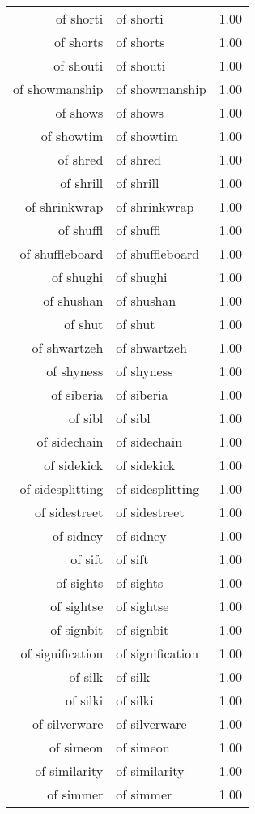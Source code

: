 \begin{table}[ht]
\begin{tabular}{rlr}
  of shorti & of shorti & 1.00 \\ 
  of shorts & of shorts & 1.00 \\ 
  of shouti & of shouti & 1.00 \\ 
  of showmanship & of showmanship & 1.00 \\ 
  of shows & of shows & 1.00 \\ 
  of showtim & of showtim & 1.00 \\ 
  of shred & of shred & 1.00 \\ 
  of shrill & of shrill & 1.00 \\ 
  of shrinkwrap & of shrinkwrap & 1.00 \\ 
  of shuffl & of shuffl & 1.00 \\ 
  of shuffleboard & of shuffleboard & 1.00 \\ 
  of shughi & of shughi & 1.00 \\ 
  of shushan & of shushan & 1.00 \\ 
  of shut & of shut & 1.00 \\ 
  of shwartzeh & of shwartzeh & 1.00 \\ 
  of shyness & of shyness & 1.00 \\ 
  of siberia & of siberia & 1.00 \\ 
  of sibl & of sibl & 1.00 \\ 
  of sidechain & of sidechain & 1.00 \\ 
  of sidekick & of sidekick & 1.00 \\ 
  of sidesplitting & of sidesplitting & 1.00 \\ 
  of sidestreet & of sidestreet & 1.00 \\ 
  of sidney & of sidney & 1.00 \\ 
  of sift & of sift & 1.00 \\ 
  of sights & of sights & 1.00 \\ 
  of sightse & of sightse & 1.00 \\ 
  of signbit & of signbit & 1.00 \\ 
  of signification & of signification & 1.00 \\ 
  of silk & of silk & 1.00 \\ 
  of silki & of silki & 1.00 \\ 
  of silverware & of silverware & 1.00 \\ 
  of simeon & of simeon & 1.00 \\ 
  of similarity & of similarity & 1.00 \\ 
  of simmer & of simmer & 1.00 \\ 

\end{tabular}
\end{table}
